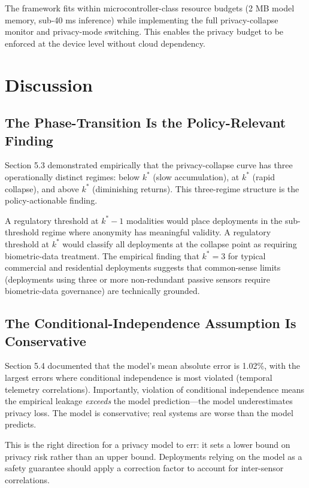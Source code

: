 \documentclass[sigconf,nonacm]{acmart}
\begin{document}
The framework fits within microcontroller-class resource budgets
(2 MB model memory, sub-40 ms inference) while implementing the
full privacy-collapse monitor and privacy-mode switching. This
enables the privacy budget to be enforced at the device level
without cloud dependency.

\section{Discussion}

\subsection{The Phase-Transition Is the Policy-Relevant Finding}

Section 5.3 demonstrated empirically that the privacy-collapse
curve has three operationally distinct regimes: below $k^*$ (slow
accumulation), at $k^*$ (rapid collapse), and above $k^*$
(diminishing returns). This three-regime structure is the
policy-actionable finding.

A regulatory threshold at $k^* - 1$ modalities would place
deployments in the sub-threshold regime where anonymity has
meaningful validity. A regulatory threshold at $k^*$ would
classify all deployments at the collapse point as requiring
biometric-data treatment. The empirical finding that $k^* = 3$
for typical commercial and residential deployments suggests
that common-sense limits (deployments using three or more
non-redundant passive sensors require biometric-data governance)
are technically grounded.

\subsection{The Conditional-Independence Assumption Is Conservative}

Section 5.4 documented that the model's mean absolute error is
1.02\%, with the largest errors where conditional independence
is most violated (temporal telemetry correlations). Importantly,
violation of conditional independence means the empirical
leakage \emph{exceeds} the model prediction---the model
underestimates privacy loss. The model is conservative; real
systems are worse than the model predicts.

This is the right direction for a privacy model to err: it
sets a lower bound on privacy risk rather than an upper bound.
Deployments relying on the model as a safety guarantee should
apply a correction factor to account for inter-sensor
correlations.
\end{document}
